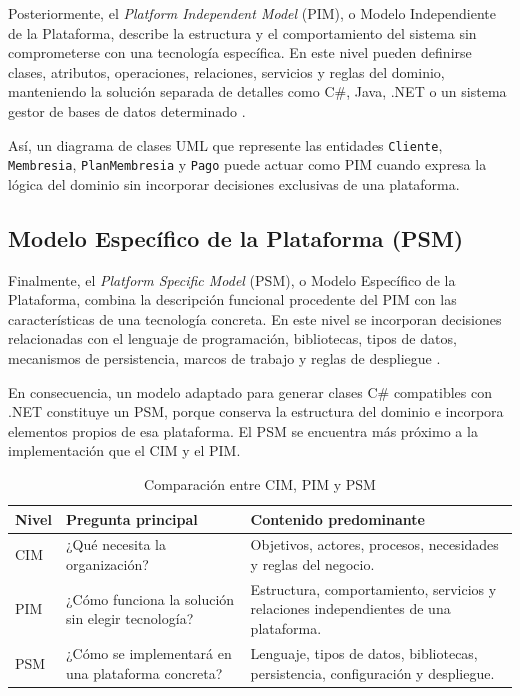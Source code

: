 \documentclass[12pt,a4paper]{article}
\begin{document}
Posteriormente, el \textit{Platform Independent Model} (PIM), o Modelo Independiente de la Plataforma, describe la estructura y el comportamiento del sistema sin comprometerse con una tecnología específica. En este nivel pueden definirse clases, atributos, operaciones, relaciones, servicios y reglas del dominio, manteniendo la solución separada de detalles como C\#, Java, .NET o un sistema gestor de bases de datos determinado \cite{omg2014mda}.

Así, un diagrama de clases UML que represente las entidades \texttt{Cliente}, \texttt{Membresia}, \texttt{PlanMembresia} y \texttt{Pago} puede actuar como PIM cuando expresa la lógica del dominio sin incorporar decisiones exclusivas de una plataforma.

\subsection{Modelo Específico de la Plataforma (PSM)}

Finalmente, el \textit{Platform Specific Model} (PSM), o Modelo Específico de la Plataforma, combina la descripción funcional procedente del PIM con las características de una tecnología concreta. En este nivel se incorporan decisiones relacionadas con el lenguaje de programación, bibliotecas, tipos de datos, mecanismos de persistencia, marcos de trabajo y reglas de despliegue \cite{omg2014mda}.

En consecuencia, un modelo adaptado para generar clases C\# compatibles con .NET constituye un PSM, porque conserva la estructura del dominio e incorpora elementos propios de esa plataforma. El PSM se encuentra más próximo a la implementación que el CIM y el PIM.

\begin{table}[htbp]
\centering
\caption{Comparación entre CIM, PIM y PSM}
\label{tab:cim-pim-psm}
\small
\begin{tabular}{>{\raggedright\arraybackslash}p{2.1cm}
                >{\raggedright\arraybackslash}p{4.1cm}
                >{\raggedright\arraybackslash}p{6.1cm}}
\toprule
\textbf{Nivel} & \textbf{Pregunta principal} & \textbf{Contenido predominante} \\
\midrule
CIM & ¿Qué necesita la organización? & Objetivos, actores, procesos, necesidades y reglas del negocio. \\
PIM & ¿Cómo funciona la solución sin elegir tecnología? & Estructura, comportamiento, servicios y relaciones independientes de una plataforma. \\
PSM & ¿Cómo se implementará en una plataforma concreta? & Lenguaje, tipos de datos, bibliotecas, persistencia, configuración y despliegue. \\
\bottomrule
\end{tabular}
\end{table}
\end{document}
